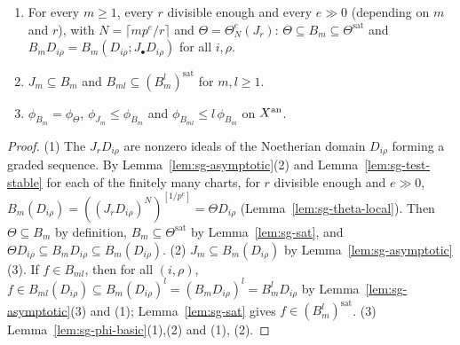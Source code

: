 \begin{lemma}\label{lem:sg-test-X}
\leanok
{}
\begin{enumerate}
\item For every $m\ge1$, every $r$ divisible enough and every $e\gg0$ (depending on $m$ and $r$), with $N=\lceil mp^e/r\rceil$ and
$\Theta=\Theta^e_N(J_r)$: $\Theta\subseteq B_m\subseteq\Theta^{\mathrm{sat}}$ and $B_mD_{i\rho}=B_m(D_{i\rho};J_\bullet D_{i\rho})$ for all $i,\rho$.
\item $J_m\subseteq B_m$ and $B_{ml}\subseteq(B_m^l)^{\mathrm{sat}}$ for $m,l\ge1$.
\item $\phi_{B_m}=\phi_\Theta$, $\phi_{J_m}\le\phi_{B_m}$ and $\phi_{B_{ml}}\le l\,\phi_{B_m}$ on $X^{\mathrm{an}}$.
\end{enumerate}
\end{lemma}

\begin{proof}
(1) The $J_rD_{i\rho}$ are nonzero ideals of the Noetherian domain $D_{i\rho}$ forming a graded sequence. By Lemma~\ref{lem:sg-asymptotic}(2) and
Lemma~\ref{lem:sg-test-stable} for each of the finitely many charts, for $r$ divisible enough and $e\gg0$,
$B_m(D_{i\rho})=((J_rD_{i\rho})^{N})^{[1/p^e]}=\Theta D_{i\rho}$ (Lemma~\ref{lem:sg-theta-local}). Then $\Theta\subseteq B_m$ by definition, $B_m\subseteq\Theta^{\mathrm{sat}}$
by Lemma~\ref{lem:sg-sat}, and $\Theta D_{i\rho}\subseteq B_mD_{i\rho}\subseteq B_m(D_{i\rho})$.
(2) $J_m\subseteq B_m(D_{i\rho})$ by Lemma~\ref{lem:sg-asymptotic}(3). If $f\in B_{ml}$, then for all $(i,\rho)$,
$f\in B_{ml}(D_{i\rho})\subseteq B_m(D_{i\rho})^l=(B_mD_{i\rho})^l=B_m^lD_{i\rho}$ by Lemma~\ref{lem:sg-asymptotic}(3) and (1); Lemma~\ref{lem:sg-sat} gives
$f\in(B_m^l)^{\mathrm{sat}}$.
(3) Lemma~\ref{lem:sg-phi-basic}(1),(2) and (1), (2).
\end{proof}

